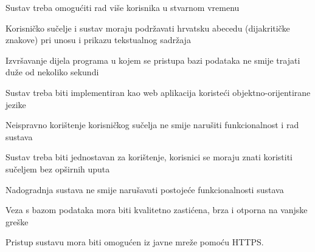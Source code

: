 	 \begin{packed_item}
	 	\item Sustav treba omogućiti rad više korisnika u stvarnom vremenu 
	 	\item  Korisničko sučelje i sustav moraju podržavati hrvatsku abecedu (dijakritičke znakove) pri unosu i prikazu tekstualnog sadržaja
	 	\item  Izvršavanje dijela programa u kojem se pristupa bazi podataka ne smije trajati duže od nekoliko sekundi
	 	\item  Sustav treba biti implementiran kao web aplikacija koristeći objektno-orijentirane jezike
	 	\item  Neispravno korištenje korisničkog sučelja ne smije narušiti funkcionalnost i rad sustava
	 	\item  Sustav treba biti jednostavan za korištenje, korisnici se moraju znati koristiti sučeljem bez opširnih uputa
	 	\item  Nadogradnja sustava ne smije narušavati postojeće funkcionalnosti sustava
	 	\item  Veza s bazom podataka mora biti kvalitetno zastićena, brza i otporna na vanjske greške
	 	\item  Pristup sustavu mora biti omogućen iz javne mreže pomoću HTTPS. 
	 \end{packed_item}
	 
